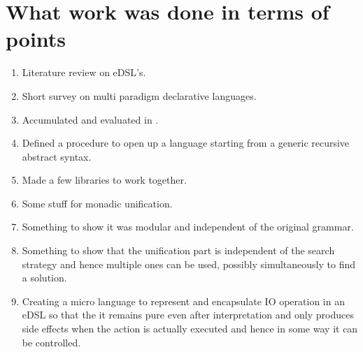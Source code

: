 \documentclass[thesis-solanki.tex]{subfiles}
\begin{document}
\section{What work was done in terms of points}
\begin{enumerate}
\item Literature review on eDSL's.

\item Short survey on multi paradigm declarative languages.

\item Accumulated and evaluated  in .

\item Defined a procedure to open up a language starting from a generic recursive abstract syntax.

\item Made a few libraries to work together.

\item Some stuff for monadic unification.

\item Something to show it was modular and independent of the original grammar.

\item
  Something to show that the unification part is independent of the search strategy and hence multiple ones can be
  used, possibly simultaneously to find a solution.

\item
  Creating a micro language to represent and encapsulate IO operation in an eDSL so that the it remains pure even
  after interpretation and only produces side effects when the action is actually executed and hence in some way it
  can be controlled.

\end{enumerate}
\end{document}

